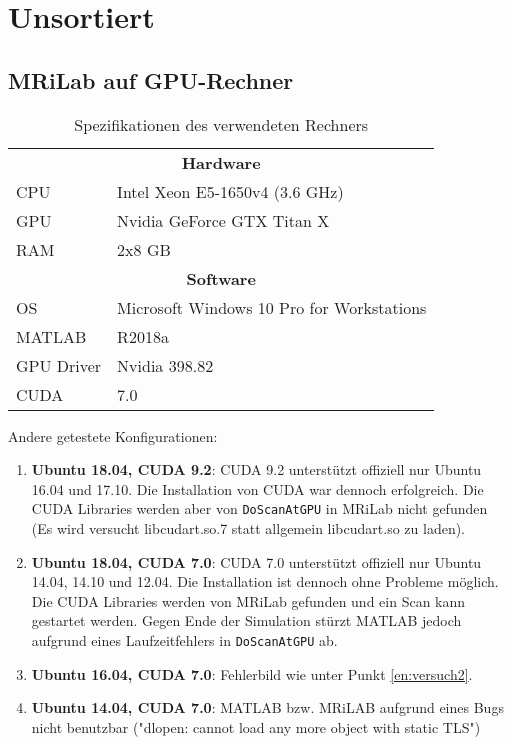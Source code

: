 \chapter{Unsortiert}

\section{MRiLab auf GPU-Rechner}

\begin{table}[H]
	\centering
	\caption{Spezifikationen des verwendeten Rechners}
	\begin{tabular}{ll}
		\toprule
		\multicolumn{2}{c}{\textbf{Hardware}} \\
		CPU & Intel Xeon E5-1650v4 (3.6 GHz) \\
		GPU & Nvidia GeForce GTX Titan X \\
		RAM & 2x8 GB \\
		\midrule
		\multicolumn{2}{c}{\textbf{Software}} \\
		OS & Microsoft Windows 10 Pro for Workstations \\
		MATLAB & R2018a \\
		GPU Driver & Nvidia 398.82 \\
		CUDA & 7.0 \\
		\bottomrule
	\end{tabular}
\end{table}

Andere getestete Konfigurationen:
\begin{enumerate}
	\item \textbf{Ubuntu 18.04, CUDA 9.2}: CUDA 9.2 unterstützt offiziell nur Ubuntu 16.04 und 17.10. Die Installation von CUDA war dennoch erfolgreich. 
	Die CUDA Libraries werden aber von \texttt{DoScanAtGPU} in MRiLab nicht gefunden (Es wird versucht libcudart.so.7 statt allgemein libcudart.so zu laden).
	
	\item\label{en:versuch2} \textbf{Ubuntu 18.04, CUDA 7.0}: CUDA 7.0 unterstützt offiziell nur Ubuntu 14.04, 14.10 und 12.04. Die Installation ist dennoch ohne Probleme möglich. Die CUDA Libraries werden von MRiLab gefunden und ein Scan kann gestartet werden. Gegen Ende der Simulation stürzt MATLAB jedoch aufgrund eines Laufzeitfehlers in \texttt{DoScanAtGPU} ab.
	
	\item \textbf{Ubuntu 16.04, CUDA 7.0}: Fehlerbild wie unter Punkt \ref{en:versuch2}.
	
	\item \textbf{Ubuntu 14.04, CUDA 7.0}: MATLAB bzw. MRiLAB aufgrund eines Bugs nicht benutzbar ("dlopen: cannot load any more object with static TLS")
	
	
\end{enumerate}









